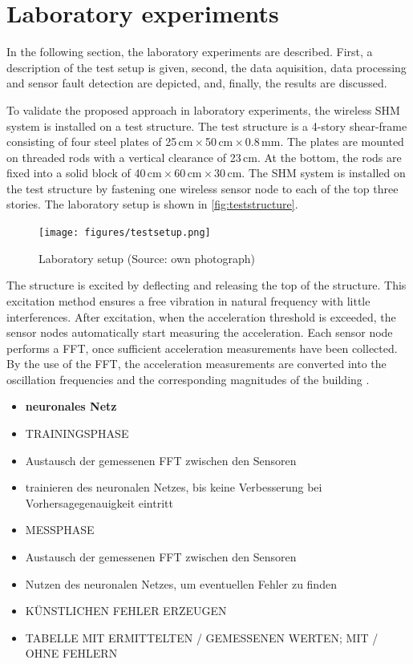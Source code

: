 \documentclass[12pt,a4paper]{scrartcl}
\begin{document}
\section*{Laboratory experiments}

In the following section, the laboratory experiments are described.
First, a description of the test setup is given, second, the data aquisition, data processing and sensor fault detection are depicted, and, finally, the results are discussed. 

To validate the proposed approach in laboratory experiments, the wireless SHM system is installed on a test structure.
The test structure is a 4-story shear-frame consisting of four steel plates of 25\,cm\,$\times$\,50\,cm\,$\times$\,0.8\,mm.
The plates are mounted on threaded rods with a vertical clearance of 23\,cm.
At the bottom, the rods are fixed into a solid block of 40\,cm\,$\times$\,60\,cm\,$\times$\,30\,cm.
The SHM system is installed on the test structure by fastening one wireless sensor node to each of the top three stories.
The laboratory setup is shown in \autoref{fig:teststructure}.

\begin{figure}[ht]
    \centering
    \texttt{[image: figures/testsetup.png]}
    \caption{Laboratory setup (Source: own photograph)}
    \label{fig:teststructure}
\end{figure}

The structure is excited by deflecting and releasing the top of the structure.
This excitation method ensures a free vibration in natural frequency with little interferences.
After excitation, when the acceleration threshold is exceeded, the sensor nodes automatically start measuring the acceleration.
Each sensor node performs a FFT, once sufficient acceleration measurements have been collected.
By the use of the FFT, the acceleration measurements are converted into the oscillation frequencies and the corresponding magnitudes of the building \cite{rao2011fast}.

\begin{itemize}
\item \textbf{neuronales Netz}
\item TRAININGSPHASE
\item Austausch der gemessenen FFT zwischen den Sensoren
\item trainieren des neuronalen Netzes, bis keine Verbesserung bei Vorhersagegenauigkeit eintritt
\item MESSPHASE
\item Austausch der gemessenen FFT zwischen den Sensoren
\item Nutzen des neuronalen Netzes, um eventuellen Fehler zu finden
\item KÜNSTLICHEN FEHLER ERZEUGEN
\item TABELLE MIT ERMITTELTEN / GEMESSENEN WERTEN; MIT / OHNE FEHLERN
\end{itemize}
\end{document}

